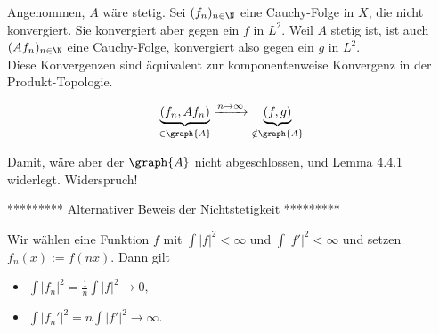 \begin{solution}
\begin{enumerate}
\begin{itemize}
    Angenommen, $A$ wäre stetig.
    Sei $(f_n)_{n \in \N}$ eine Cauchy-Folge in $X$, die nicht konvergiert.
    Sie konvergiert aber gegen ein $f$ in $L^2$.
    Weil $A$ stetig ist, ist auch $(A f_n)_{n \in \N}$ eine Cauchy-Folge, konvergiert also gegen ein $g$ in $L^2$. \\

    Diese Konvergenzen sind äquivalent zur komponentenweise Konvergenz in der Produkt-Topologie.

    \begin{align*}
      \underbrace{(f_n, A f_n)}_{\in \graph{A}}
      \xrightarrow{n \to \infty}
      \underbrace{(f, g)}_{\notin \graph{A}}
    \end{align*}

    Damit, wäre aber der $\graph{A}$ nicht abgeschlossen, und Lemma 4.4.1 widerlegt.
    Widerspruch!
    \FloatBarrier
  \end{itemize}

  ********* Alternativer Beweis der Nichtstetigkeit *********

Wir wählen eine Funktion $f$ mit $\int |f|^2 < \infty$ und $\int |f'|^2 < \infty$ und setzen $f_n(x) := f(nx).$ Dann gilt
\begin{itemize}
    \item $\int |f_n|^2 = \frac{1}{n} \int |f|^2 \longrightarrow 0,$
    \item $\int|f_n'|^2 = n \int |f'|^2 \longrightarrow \infty.$
\end{itemize}

\end{enumerate}

\end{solution}
